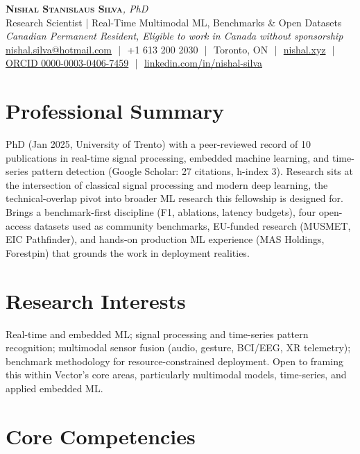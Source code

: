 \documentclass[11pt]{article}
\newcommand{\cvName}{Nishal Stanislaus Silva}
\newcommand{\cvStatus}{Canadian Permanent Resident, Eligible to work in Canada without sponsorship}
\newcommand{\cvTagline}{Research Scientist | Real-Time Multimodal ML, Benchmarks \& Open Datasets}
\begin{document}
\pagestyle{empty}
\begin{center}
    {\LARGE \scshape \textbf{\cvName}}{\large \textit{, PhD}}
    \\[1pt]
    {\small \cvTagline}
    \\[1pt]
    {\footnotesize\textit{\cvStatus}}
    \\[1pt]
    {\small
    \href{mailto:nishal.silva@hotmail.com}{nishal.silva@hotmail.com}
    \,\,|\,\, +1 613 200 2030
    \,\,|\,\, Toronto, ON
    \,\,|\,\, \href{https://nishal.xyz}{nishal.xyz}
    \,\,|\,\, \href{https://orcid.org/0000-0003-0406-7459}{ORCID 0000-0003-0406-7459}
    \,\,|\,\, \href{https://www.linkedin.com/in/nishal-silva}{linkedin.com/in/nishal-silva}}
\end{center}

\section*{Professional Summary}

PhD (Jan 2025, University of Trento) with a peer-reviewed record of 10 publications in real-time signal processing, embedded machine learning, and time-series pattern detection (Google Scholar: 27 citations, h-index 3). Research sits at the intersection of classical signal processing and modern deep learning, the technical-overlap pivot into broader ML research this fellowship is designed for. Brings a benchmark-first discipline (F1, ablations, latency budgets), four open-access datasets used as community benchmarks, EU-funded research (MUSMET, EIC Pathfinder), and hands-on production ML experience (MAS Holdings, Forestpin) that grounds the work in deployment realities.

\section*{Research Interests}

Real-time and embedded ML; signal processing and time-series pattern recognition; multimodal sensor fusion (audio, gesture, BCI/EEG, XR telemetry); benchmark methodology for resource-constrained deployment. Open to framing this within Vector's core areas, particularly multimodal models, time-series, and applied embedded ML.

\section*{Core Competencies}
\end{document}
